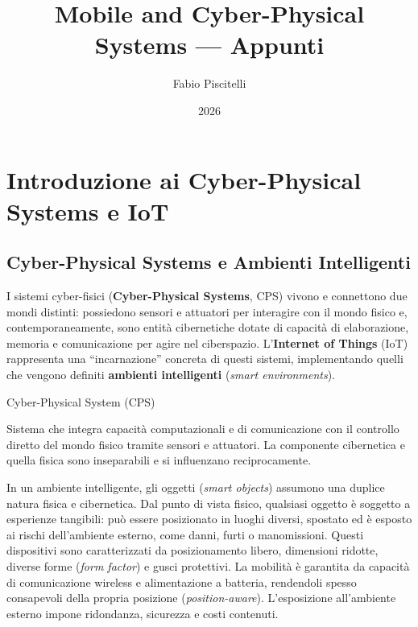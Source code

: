 \documentclass[
  italian,
  openany]{book}
\title{Mobile and Cyber-Physical Systems --- Appunti}
\author{Fabio Piscitelli}
\date{2026}
\begin{document}
\frontmatter
\maketitle

{
\setcounter{tocdepth}{1}
\tableofcontents
}
\mainmatter
\chapter{Introduzione ai Cyber-Physical Systems e
IoT}\label{introduzione-ai-cyber-physical-systems-e-iot}

\section{Cyber-Physical Systems e Ambienti
Intelligenti}\label{cyber-physical-systems-e-ambienti-intelligenti}

I sistemi cyber-fisici (\textbf{Cyber-Physical Systems}, CPS) vivono e
connettono due mondi distinti: possiedono sensori e attuatori per
interagire con il mondo fisico e, contemporaneamente, sono entità
cibernetiche dotate di capacità di elaborazione, memoria e comunicazione
per agire nel ciberspazio. L'\textbf{Internet of Things} (IoT)
rappresenta una ``incarnazione'' concreta di questi sistemi,
implementando quelli che vengono definiti \textbf{ambienti intelligenti}
(\emph{smart environments}).

\begin{calloutdefinition}{Cyber-Physical System (CPS)}

Sistema che integra capacità computazionali e di comunicazione con il
controllo diretto del mondo fisico tramite sensori e attuatori. La
componente cibernetica e quella fisica sono inseparabili e si
influenzano reciprocamente.

\end{calloutdefinition}

In un ambiente intelligente, gli oggetti (\emph{smart objects}) assumono
una duplice natura fisica e cibernetica. Dal punto di vista fisico,
qualsiasi oggetto è soggetto a esperienze tangibili: può essere
posizionato in luoghi diversi, spostato ed è esposto ai rischi
dell'ambiente esterno, come danni, furti o manomissioni. Questi
dispositivi sono caratterizzati da posizionamento libero, dimensioni
ridotte, diverse forme (\emph{form factor}) e gusci protettivi. La
mobilità è garantita da capacità di comunicazione wireless e
alimentazione a batteria, rendendoli spesso consapevoli della propria
posizione (\emph{position-aware}). L'esposizione all'ambiente esterno
impone ridondanza, sicurezza e costi contenuti.
\end{document}
